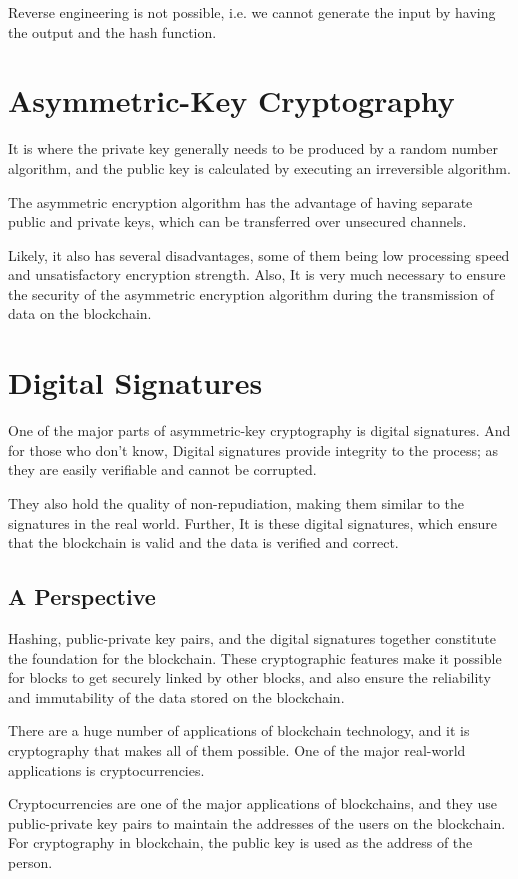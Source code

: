 \documentclass[BTech]{srmuthesis}
\begin{document}
 Reverse engineering is not possible, i.e. we cannot generate the input by having the output and the hash function.

 \section{Asymmetric-Key Cryptography}
 It is where the private key generally needs to be produced by a random number algorithm, and the public key is calculated by executing an irreversible algorithm.

 The asymmetric encryption algorithm has the advantage of having separate public and private keys, which can be transferred over unsecured channels.

 Likely, it also has several disadvantages, some of them being low processing speed and unsatisfactory encryption strength. Also, It is very much necessary to ensure the security of the asymmetric encryption algorithm during the transmission of data on the blockchain.

 \section{Digital Signatures}
 One of the major parts of asymmetric-key cryptography is digital signatures. And for those who don’t know, Digital signatures provide integrity to the process; as they are easily verifiable and cannot be corrupted.

 They also hold the quality of non-repudiation, making them similar to the signatures in the real world. Further, It is these digital signatures, which ensure that the blockchain is valid and the data is verified and correct.

 \subsection{A Perspective}
 Hashing, public-private key pairs, and the digital signatures together constitute the foundation for the blockchain. These cryptographic features make it possible for blocks to get securely linked by other blocks, and also ensure the reliability and immutability of the data stored on the blockchain.

 There are a huge number of applications of blockchain technology, and it is cryptography that makes all of them possible. One of the major real-world applications is cryptocurrencies.

 Cryptocurrencies are one of the major applications of blockchains, and they use public-private key pairs to maintain the addresses of the users on the blockchain. For cryptography in blockchain, the public key is used as the address of the person.
\end{document}
